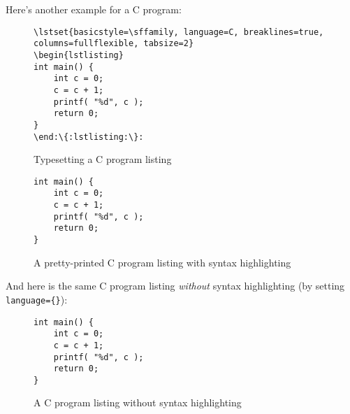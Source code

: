 Here's another example for a C program:

\begin{figure}[hbt!]
\begin{lstlisting}[escapechar={:}, texcl=false,language={}]
\lstset{basicstyle=\sffamily, language=C, breaklines=true, columns=fullflexible, tabsize=2}
\begin{lstlisting}
int main() {
	int c = 0;
	c = c + 1;
	printf( "%d", c );
	return 0;
}
\end:\{:lstlisting:\}:
\end{lstlisting}
\caption{Typesetting a C program listing}\label{fig:lst:c}
\end{figure}

\begin{figure}[hbt!]
\lstset{basicstyle=\sffamily, language=C, breaklines=true, columns=fullflexible, framesep=10pt, xleftmargin=.4\textwidth, tabsize=4}
\begin{lstlisting}
int main() {
	int c = 0;
	c = c + 1;
	printf( "%d", c );
	return 0;
}
\end{lstlisting}
\caption{A pretty-printed C program listing with syntax highlighting}
\end{figure}


And here is the same C program listing \emph{without} syntax highlighting (by setting \verb|language={}|):

\begin{figure}[hbt!]

\begin{lstlisting}
int main() {
	int c = 0;
	c = c + 1;
	printf( "%d", c );
	return 0;
}
\end{lstlisting}
\caption{A C program listing without syntax highlighting}
\end{figure}
